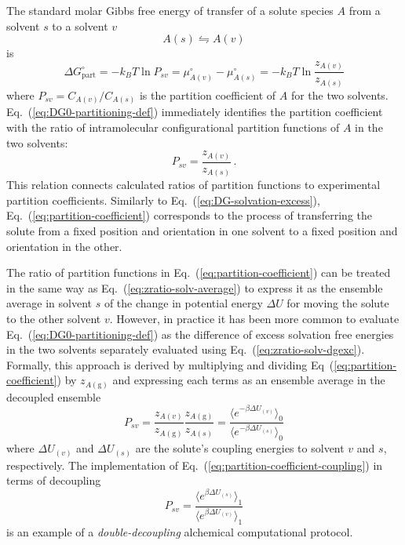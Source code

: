 \documentclass[9pt,bestpractices]{livecoms}
\begin{document}
The standard molar Gibbs free energy of transfer of a solute species $A$ from a  solvent $s$ to a solvent $v$
\begin{equation}
A(s)  \leftrightharpoons A(v)
\end{equation}
is
\begin{equation}
  \Delta G^\circ_{\mathrm{part}} = -k_B T \ln P_{sv} = \mu^\circ_{A(v)}  - \mu^\circ_{A(s)} = -k_B T \ln \frac{z_{A(v)}}{z_{A(s)}}
  \label{eq:DG0-partitioning-def}
\end{equation}
where $P_{sv} = C_{A(v)}/C_{A(s)}$ is the partition coefficient of $A$ for the two solvents.~\cite{rustenburg2016measuring} Eq.~(\ref{eq:DG0-partitioning-def}) 
immediately identifies the partition coefficient with the ratio of intramolecular configurational partition functions of $A$ in the two solvents:
\begin{equation}
  P_{sv} = \frac{z_{A(v)}}{z_{A(s)}} \, .
  \label{eq:partition-coefficient}
\end{equation}
This relation connects calculated ratios of partition functions to experimental partition coefficients. Similarly to Eq.~(\ref{eq:DG-solvation-excess}), Eq.~(\ref{eq:partition-coefficient}) corresponds to the process of transferring the solute from a fixed position and orientation in one solvent to a fixed position and orientation in the other.

The ratio of partition functions in Eq.~(\ref{eq:partition-coefficient}) can be treated in the same way as Eq.~(\ref{eq:zratio-solv-average}) to express it as the ensemble average in solvent $s$ of the change in potential energy $\Delta U$ for moving the solute to the other solvent $v$. However, in practice it has been more common to evaluate Eq.~(\ref{eq:DG0-partitioning-def}) as the difference of excess solvation free energies in the two solvents separately evaluated using Eq.~(\ref{eq:zratio-solv-dgexc}).~\cite{bosisio2016blinded} Formally, this approach is derived by multiplying and dividing Eq~(\ref{eq:partition-coefficient}) by $z_{A(\mathrm{g})}$ and expressing each terms as an ensemble average in the decoupled ensemble
\begin{equation}
  P_{sv} = \frac{z_{A(v)}}{z_{A(\mathrm{g})}}  \frac{z_{A(\mathrm{g})}}{z_{A(s)}} = \frac{\langle e^{-\beta \Delta U_{(v)}} \rangle_0}{\langle e^{-\beta \Delta U_{(s)} } \rangle_0 }
  \label{eq:partition-coefficient-coupling}
\end{equation}
where $\Delta U_{(v)}$ and $\Delta U_{(s)}$ are the solute's coupling energies to solvent $v$ and $s$, respectively. 
The implementation of Eq.~(\ref{eq:partition-coefficient-coupling}) in terms of decoupling
\begin{equation}
P_{sv} = \frac{\langle e^{\beta \Delta U_{(s)}} \rangle_1}{\langle e^{\beta \Delta U_{(v)} } \rangle_1 }
\label{eq:partition-coefficient-decoupling}
\end{equation}
is an example of a \emph{double-decoupling} alchemical computational protocol.~\cite{hermans1986freeenergy,gilson1997statisticalthermodynamic}
\end{document}
